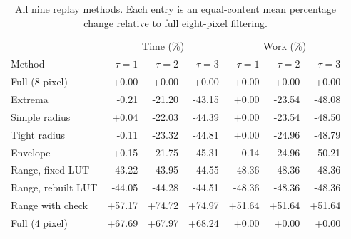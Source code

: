 \begin{table}[H]\centering
\caption{All nine replay methods. Each entry is an equal-content mean percentage change relative to full eight-pixel filtering.}\label{tab:alltau}
\setlength{\tabcolsep}{5pt}
\begin{tabular}{lrrrrrr}\toprule
& \multicolumn{3}{c}{Time (\%)} & \multicolumn{3}{c}{Work (\%)}\\
Method & $\tau=1$ & $\tau=2$ & $\tau=3$ & $\tau=1$ & $\tau=2$ & $\tau=3$\\\midrule
Full (8 pixel) & +0.00 & +0.00 & +0.00 & +0.00 & +0.00 & +0.00\\
Extrema & -0.21 & -21.20 & -43.15 & +0.00 & -23.54 & -48.08\\
Simple radius & +0.04 & -22.03 & -44.39 & +0.00 & -23.54 & -48.50\\
Tight radius & -0.11 & -23.32 & -44.81 & +0.00 & -24.96 & -48.79\\
Envelope & +0.15 & -21.75 & -45.31 & -0.14 & -24.96 & -50.21\\
Range, fixed LUT & -43.22 & -43.95 & -44.55 & -48.36 & -48.36 & -48.36\\
Range, rebuilt LUT & -44.05 & -44.28 & -44.51 & -48.36 & -48.36 & -48.36\\
Range with check & +57.17 & +74.72 & +74.97 & +51.64 & +51.64 & +51.64\\
Full (4 pixel) & +67.69 & +67.97 & +68.24 & +0.00 & +0.00 & +0.00\\
\bottomrule\end{tabular}
\end{table}
